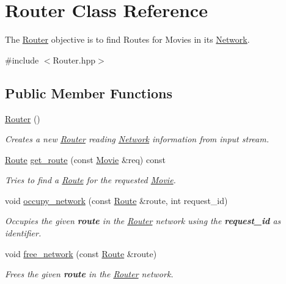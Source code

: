 \hypertarget{class_router}{\section{Router Class Reference}
\label{d4/d44/class_router}
}


The \hyperlink{class_router}{Router} objective is to find Routes for Movies in its \hyperlink{class_network}{Network}.  




{\ttfamily \#include $<$Router.\-hpp$>$}

\subsection*{Public Member Functions}
\begin{DoxyCompactItemize}
\item 
\hyperlink{class_router_a555428efbf07e22776889b8d9b88027f}{Router} ()
\begin{DoxyCompactList}\small\item\em Creates a new \hyperlink{class_router}{Router} reading \hyperlink{class_network}{Network} information from input stream. \end{DoxyCompactList}\item 
\hyperlink{class_route}{Route} \hyperlink{class_router_a657111f5b8336eb495cbc349dd5b9bb7}{get\-\_\-route} (const \hyperlink{class_movie}{Movie} \&req) const 
\begin{DoxyCompactList}\small\item\em Tries to find a \hyperlink{class_route}{Route} for the requested \hyperlink{class_movie}{Movie}. \end{DoxyCompactList}\item 
void \hyperlink{class_router_affcb472eab1ef1ce4acf51f8bf8cf1bc}{occupy\-\_\-network} (const \hyperlink{class_route}{Route} \&route, int request\-\_\-id)
\begin{DoxyCompactList}\small\item\em Occupies the given {\bfseries route} in the \hyperlink{class_router}{Router} network using the {\bfseries request\-\_\-id} as identifier. \end{DoxyCompactList}\item 
void \hyperlink{class_router_af03c1d5e3a64c1176e7c65f2d6bc0342}{free\-\_\-network} (const \hyperlink{class_route}{Route} \&route)
\begin{DoxyCompactList}\small\item\em Frees the given {\bfseries route} in the \hyperlink{class_router}{Router} network. \end{DoxyCompactList}\end{DoxyCompactItemize}



